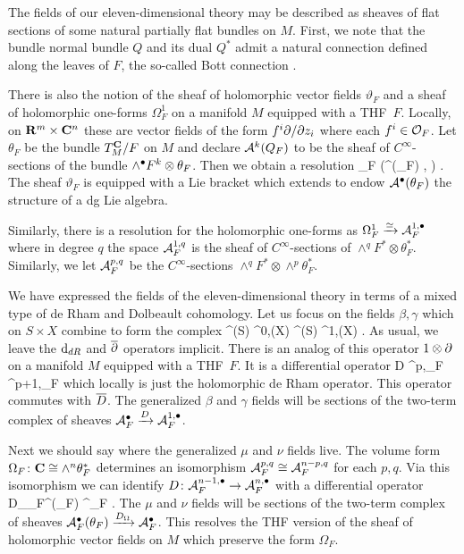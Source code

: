 The fields of our eleven-dimensional theory may be described as sheaves of flat sections of some natural partially flat bundles on $M$. First, we note that the bundle normal bundle $Q$ and its dual $Q^{*}$ admit a natural connection defined along the leaves of $F$, the so-called Bott connection \cite{KamberTondeur}.

There is also the notion of the sheaf of holomorphic vector fields $\vartheta_F$ and a sheaf of holomorphic one-forms $\Omega^1_F$ on a manifold $M$ equipped with a THF~$F$.
Locally, on $\mathbf{R}^m \times \mathbf{C}^n$ these are vector fields of the form $f^i \partial / \partial z_i$ where each $f^i \in \mathcal O_F$.
Let $\theta_F$ be the bundle $T_M ^{\mathbf{C}} / F$ on $M$ and declare
$\mathcal A^k(Q_F)$ to be the sheaf of $C^\infty$-sections of the bundle $\wedge^\bullet F^k \otimes \theta_F$.
Then we obtain a resolution
\beqn
\vartheta_F \xto{\simeq} \left(\cA^\bu(\theta_F) , \thfd \otimes \id\right) .
\eeqn
The sheaf $\vartheta_F$ is equipped with a Lie bracket which extends to endow $\mathcal A^\bullet(\theta_F)$ the structure of a dg Lie algebra.

Similarly, there is a resolution for the holomorphic one-forms as $\Omega^1_F \xrightarrow{\simeq} \mathcal A^{1,\bullet}_F$ where in degree $q$ the space $\mathcal A^{1,q}_F$ is the sheaf of $C^\infty$-sections of $\wedge^q F^* \otimes \theta_F^*$.
Similarly, we let $\mathcal A^{p,q}_F$ be the $C^\infty$-sections $\wedge^q F^* \otimes \wedge^p \theta_F^*$.

We have expressed the fields of the eleven-dimensional theory in terms of a mixed type of de Rham and Dolbeault cohomology.
Let us focus on the fields $\beta,\gamma$ which on $S \times X$ combine to form the complex
\beqn\label{eqn:drdol}
\Omega^{\bu}(S) \otimes \Omega^{0,\bu}(X) \xto{1 \otimes \del} \Omega^{\bu}(S) \otimes \Omega^{1,\bu}(X) .
\eeqn
As usual, we leave the ${\rm d}_{dR}$ and $\overline{\partial}$ operators implicit.
There is an analog of this operator $1 \otimes \partial$ on a manifold $M$ equipped with a THF~$F$.
It is a differential operator 
\beqn
D \colon \cA^{p,\bu}_F \to \cA^{p+1,\bu}_F
\eeqn
which locally is just the holomorphic de Rham operator. 
This operator commutes with $\overline{D}$.
The generalized $\beta$ and $\gamma$ fields will be sections of the two-term complex of sheaves $\mathcal A^\bullet_F \xrightarrow{D} \mathcal A^{1,\bullet}_F$.

\newcommand\Div{D_\Omega}

Next we should say where the generalized $\mu$ and $\nu$ fields live. 
The volume form $\Omega_F \colon \mathbf{C} \cong \wedge^n \theta_F^*$ determines an isomorphism $\mathcal A^{p,q}_F \cong \mathcal A^{n-p,q}_F$ for each $p,q$.
Via this isomorphism we can identify $D \colon \mathcal A^{n-1,\bullet}_F \to \mathcal A^{n,\bullet}_F$ with a differential operator
\beqn
\Div \colon \cA_F^{\bu}(\theta_F) \to \cA^\bu_F .
\eeqn
The $\mu$ and $\nu$ fields will be sections of the two-term complex of sheaves $\cA^\bu_F(\theta_F) \xto{\Div} \cA^\bu_F$. 
This resolves the THF version of the sheaf of holomorphic vector fields on $M$ which preserve the form $\Omega_F$. 

